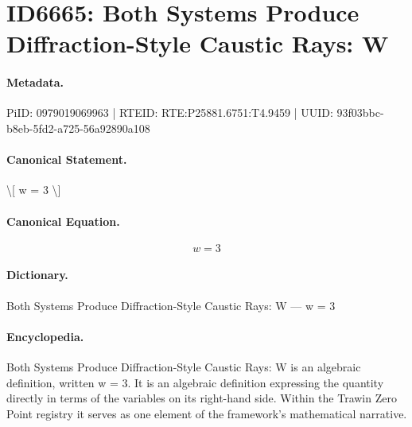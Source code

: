 \section*{ID6665: Both Systems Produce Diffraction-Style Caustic Rays: W}
\paragraph{Metadata.}
PiID: 0979019069963 | RTEID: RTE:P25881.6751:T4.9459 | UUID: 93f03bbc-b8eb-5fd2-a725-56a92890a108

\paragraph{Canonical Statement.}
\textbackslash{}[ w = 3 \textbackslash{}]

\paragraph{Canonical Equation.}
\[
w = 3
\]

\paragraph{Dictionary.}
Both Systems Produce Diffraction-Style Caustic Rays: W — w = 3

\paragraph{Encyclopedia.}
Both Systems Produce Diffraction-Style Caustic Rays: W is an algebraic definition, written w = 3. It is an algebraic definition expressing the quantity directly in terms of the variables on its right-hand side. Within the Trawin Zero Point registry it serves as one element of the framework's mathematical narrative.
